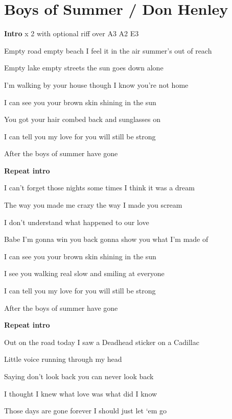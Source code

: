 \section{Boys of Summer / Don Henley}\label{sec:boysofsummer}
\Aminor
\Fmajor
\Gmajor
\Cmajor

\textbf{Intro}     x 2 with optional riff over A3 A2 E3

 Empty road empty beach  I feel it in the air summer’s out of reach

 Empty lake empty streets the sun goes down alone

 I’m walking by your house though I know you’re not home

 I can see you  your brown skin shining in the sun

You got your hair combed back and  sunglasses on

 I can tell you my  love for you will still be strong 

After the boys of  summer have gone

\textbf{Repeat intro}

 I can’t forget those nights some times I think it was a dream

 The way you made me crazy the way I made you scream

 I don’t understand what happened to our love 

Babe I’m gonna win you back gonna show you what I’m made of

 I can see you  your brown skin shining in the sun

I see you walking real slow and  smiling at everyone

 I can tell you my  love for you will still be strong

After the boys of  summer have gone

\textbf{Repeat intro}

 Out on the road today I saw a Deadhead sticker on a Cadillac

 Little voice running through my head

Saying don’t look back you can never look back

 I thought I knew what love was what did I know

 Those days are gone forever I should just let ‘em go 

